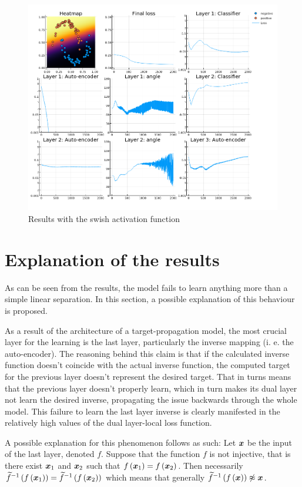 \begin{figure}[h]
	\centering
	\includegraphics[width=500pt]{images/temp-swish.png}
	\caption{Results with the swish activation function}\label{swish}
\end{figure}

\section{Explanation of the results}

As can be seen from the results, the model fails to learn anything more than a simple linear separation. In this section, a possible explanation of this behaviour is proposed.

As a result of the architecture of a target-propagation model, the most crucial layer for the learning is the last layer, particularly the inverse mapping (i. e. the auto-encoder). The reasoning behind this claim is that if the calculated inverse function doesn't coincide with the actual inverse function, the computed target for the previous layer doesn't represent the desired target. That in turns means that the previous layer doesn't properly learn, which in turn makes its dual layer not learn the desired inverse, propagating the issue backwards through the whole model. This failure to learn the last layer inverse is clearly manifested in the relatively high values of the dual layer-local loss function.

A possible explanation for this phenomenon follows as such: Let \( \bm{x} \) be the input of the last layer, denoted \( f \). Suppose that the function \( f \) is not injective, that is there exist \( \bm{x}_1 \) and \( \bm{x}_2 \) such that \( f \left( \bm{x}_1 \right) = f \left( \bm{x}_2 \right) \). Then necessarily \( \widetilde{f}^{-1} \left( f \left( \bm{x}_1 \right) \right) = \widetilde{f}^{-1} \left( f \left( \bm{x}_2 \right) \right) \) which means that generally \( \widetilde{f}^{-1} \left( f \left( \bm{x} \right) \right) \not\approx \bm{x} \).

